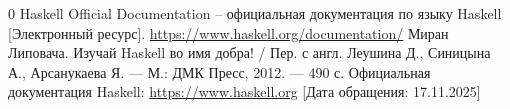 \documentclass[a4paper, final]{article}
\begin{document}
\newpage
{}

\vspace{-1.5cm}
\begin{thebibliography}{0}
Haskell Official Documentation -- официальная документация по языку Haskell [Электронный ресурс]. 	 
\href {https://www.haskell.org/documentation/}{https://www.haskell.org/documentation/}
 Миран Липовача. Изучай Haskell во имя добра! / Пер. с англ. Леушина Д., Синицына А., Арсанукаева Я. — М.: ДМК Пресс, 2012. — 490 с.
 Официальная документация Haskell: \url{https://www.haskell.org} [Дата обращения: 17.11.2025]

\end{thebibliography}
\end{document}
